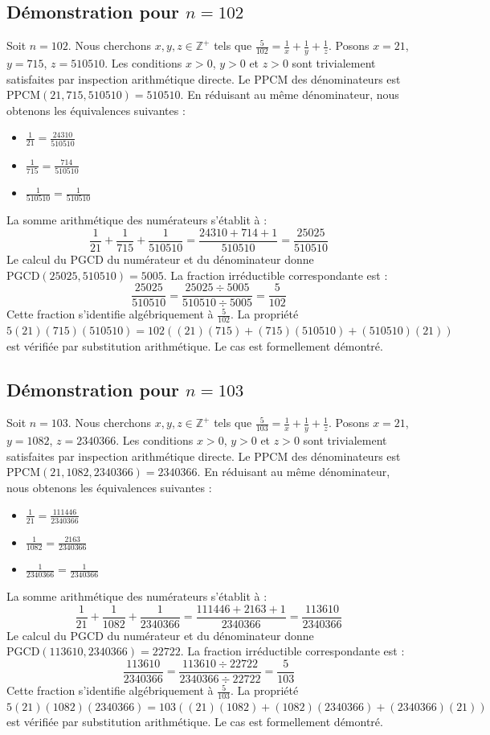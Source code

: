 \documentclass[12pt,a4paper]{article}
\begin{document}
\subsection{Démonstration pour $n = 102$}
Soit $n = 102$. Nous cherchons $x, y, z \in \mathbb{Z}^{+}$ tels que $\frac{5}{102} = \frac{1}{x} + \frac{1}{y} + \frac{1}{z}$.
Posons $x = 21$, $y = 715$, $z = 510510$.
Les conditions $x > 0$, $y > 0$ et $z > 0$ sont trivialement satisfaites par inspection arithmétique directe.
Le PPCM des dénominateurs est $\text{PPCM}(21, 715, 510510) = 510510$.
En réduisant au même dénominateur, nous obtenons les équivalences suivantes :
\begin{itemize}
    \item $\frac{1}{21} = \frac{24310}{510510}$
    \item $\frac{1}{715} = \frac{714}{510510}$
    \item $\frac{1}{510510} = \frac{1}{510510}$
\end{itemize}
La somme arithmétique des numérateurs s'établit à :
$$ \frac{1}{21} + \frac{1}{715} + \frac{1}{510510} = \frac{24310 + 714 + 1}{510510} = \frac{25025}{510510} $$
Le calcul du PGCD du numérateur et du dénominateur donne $\text{PGCD}(25025, 510510) = 5005$.
La fraction irréductible correspondante est :
$$ \frac{25025}{510510} = \frac{25025 \div 5005}{510510 \div 5005} = \frac{5}{102} $$
Cette fraction s'identifie algébriquement à $\frac{5}{102}$.
La propriété $5(21)(715)(510510) = 102((21)(715) + (715)(510510) + (510510)(21))$ est vérifiée par substitution arithmétique.
Le cas est formellement démontré.

\subsection{Démonstration pour $n = 103$}
Soit $n = 103$. Nous cherchons $x, y, z \in \mathbb{Z}^{+}$ tels que $\frac{5}{103} = \frac{1}{x} + \frac{1}{y} + \frac{1}{z}$.
Posons $x = 21$, $y = 1082$, $z = 2340366$.
Les conditions $x > 0$, $y > 0$ et $z > 0$ sont trivialement satisfaites par inspection arithmétique directe.
Le PPCM des dénominateurs est $\text{PPCM}(21, 1082, 2340366) = 2340366$.
En réduisant au même dénominateur, nous obtenons les équivalences suivantes :
\begin{itemize}
    \item $\frac{1}{21} = \frac{111446}{2340366}$
    \item $\frac{1}{1082} = \frac{2163}{2340366}$
    \item $\frac{1}{2340366} = \frac{1}{2340366}$
\end{itemize}
La somme arithmétique des numérateurs s'établit à :
$$ \frac{1}{21} + \frac{1}{1082} + \frac{1}{2340366} = \frac{111446 + 2163 + 1}{2340366} = \frac{113610}{2340366} $$
Le calcul du PGCD du numérateur et du dénominateur donne $\text{PGCD}(113610, 2340366) = 22722$.
La fraction irréductible correspondante est :
$$ \frac{113610}{2340366} = \frac{113610 \div 22722}{2340366 \div 22722} = \frac{5}{103} $$
Cette fraction s'identifie algébriquement à $\frac{5}{103}$.
La propriété $5(21)(1082)(2340366) = 103((21)(1082) + (1082)(2340366) + (2340366)(21))$ est vérifiée par substitution arithmétique.
Le cas est formellement démontré.
\end{document}
